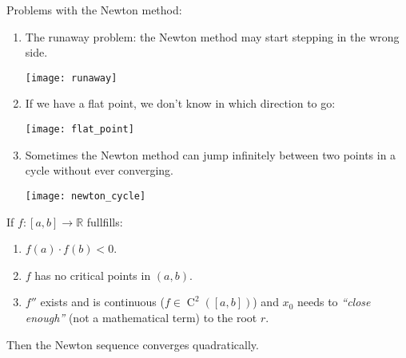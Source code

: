 Problems with the Newton method:
\begin{enumerate}
    \item {
        The runaway problem: the Newton method may start stepping in the wrong side.
        \begin{figure*}[h]
            \centering
            \texttt{[image: runaway]}
        \end{figure*}
    }
    \item {
        If we have a flat point, we don't know in which direction to go:
        \begin{figure*}[h]
            \centering
            \texttt{[image: flat\_point]}
        \end{figure*}
    }
    \item {
        Sometimes the Newton method can jump infinitely between two points in a cycle
        without ever converging.
        \begin{figure*}[h]
            \centering
            \texttt{[image: newton\_cycle]}
        \end{figure*}
    }
\end{enumerate}
\pagebreak
\begin{theorem}
    If $f : [a, b] \to \mathbb{R}$ fullfills:
    \begin{enumerate}
        \item {
            $f(a) \cdot f(b) < 0$.
        }
        \item {
            $f$ has no critical points in $(a, b)$.
        }
        \item {
            $f''$ exists and is continuous ($f \in \operatorname{C}^2([a, b])$)
            and $x_0$ needs to \textit{``close enough''} (not a mathematical term)
            to the root $r$.
        }
    \end{enumerate}
    Then the Newton sequence converges quadratically.
\end{theorem}
